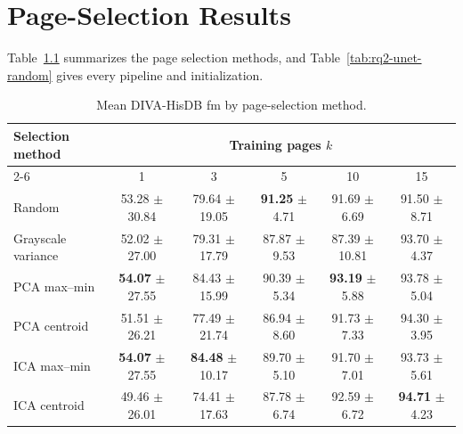 \chapter{Page-Selection Results}
\label{app:rq2-selection}

Table~\ref{tab:rq2-fm-by-selection} summarizes the page selection methods, and Table~\ref{tab:rq2-unet-random} gives every pipeline and initialization.

\begin{table}[htbp]
    \centering
    \footnotesize
    \setlength{\tabcolsep}{3pt}
    \caption{Mean DIVA-HisDB \gls{fm} by page-selection method.}
    \label{tab:rq2-fm-by-selection}
    \begin{tabular}{@{}lccccc@{}}
        \toprule
        Selection method & \multicolumn{5}{c}{Training pages \(k\)} \\
        \cmidrule(l){2-6}
         & 1 & 3 & 5 & 10 & 15 \\
        \midrule
        Random & 53.28 \(\pm\) 30.84 & 79.64 \(\pm\) 19.05 & \textbf{91.25} \(\pm\) 4.71 & 91.69 \(\pm\) 6.69 & 91.50 \(\pm\) 8.71 \\
        Grayscale variance & 52.02 \(\pm\) 27.00 & 79.31 \(\pm\) 17.79 & 87.87 \(\pm\) 9.53 & 87.39 \(\pm\) 10.81 & 93.70 \(\pm\) 4.37 \\
        PCA max--min & \textbf{54.07} \(\pm\) 27.55 & 84.43 \(\pm\) 15.99 & 90.39 \(\pm\) 5.34 & \textbf{93.19} \(\pm\) 5.88 & 93.78 \(\pm\) 5.04 \\
        PCA centroid & 51.51 \(\pm\) 26.21 & 77.49 \(\pm\) 21.74 & 86.94 \(\pm\) 8.60 & 91.73 \(\pm\) 7.33 & 94.30 \(\pm\) 3.95 \\
        ICA max--min & \textbf{54.07} \(\pm\) 27.55 & \textbf{84.48} \(\pm\) 10.17 & 89.70 \(\pm\) 5.10 & 91.70 \(\pm\) 7.01 & 93.73 \(\pm\) 5.61 \\
        ICA centroid & 49.46 \(\pm\) 26.01 & 74.41 \(\pm\) 17.63 & 87.78 \(\pm\) 6.74 & 92.59 \(\pm\) 6.72 & \textbf{94.71} \(\pm\) 4.23 \\
        \bottomrule
    \end{tabular}
\end{table}

